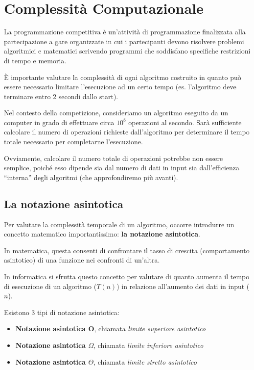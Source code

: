 	
\chapter{Complessità Computazionale}

La programmazione competitiva è un'attività di programmazione finalizzata alla partecipazione a gare organizzate in cui i partecipanti devono risolvere problemi algoritmici e matematici scrivendo programmi che soddisfano specifiche restrizioni di tempo e memoria.

È importante valutare la complessità di ogni algoritmo costruito in quanto può essere necessario limitare l'esecuzione ad un certo tempo (es. l'algoritmo deve terminare entro 2 secondi dallo start).

Nel contesto della competizione, consideriamo un algoritmo eseguito da un computer in grado di effettuare circa $10^8$ operazioni al secondo.
Sarà sufficiente calcolare il numero di operazioni richieste dall’algoritmo per determinare il tempo totale necessario per completarne l’esecuzione.

Ovviamente, calcolare il numero totale di operazioni potrebbe non essere semplice, poiché esso dipende sia dal numero di dati in input sia dall’efficienza “interna” degli algoritmi (che approfondiremo più avanti).

\section{La notazione asintotica}
Per valutare la complessità temporale di un algoritmo, occorre introdurre un concetto matematico importantissimo: \textbf{la notazione asintotica}.

In matematica, questa consenti di confrontare il tasso di crescita (comportamento asintotico) di una funzione nei confronti di un'altra.

In informatica si sfrutta questo concetto per valutare di quanto aumenta il tempo di esecuzione di un algoritmo ($T(n)$) in relazione all'aumento dei dati in input ($n$).

Esistono 3 tipi di notazione asintotica:
\begin{itemize}
	\item \textbf{Notazione asintotica O}, chiamata \textit{limite superiore asintotico}
	\item \textbf{Notazione asintotica $\Omega$}, chiamata \textit{limite inferiore asintotico}
	\item \textbf{Notazione asintotica $\Theta$}, chiamata \textit{limite stretto asintotico}
\end{itemize}

